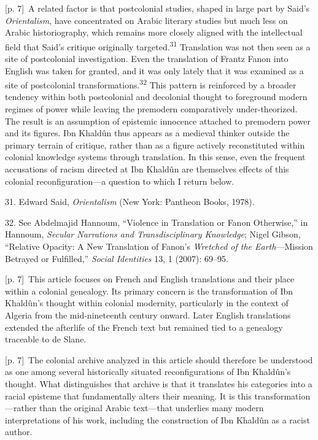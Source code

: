 \documentclass[10pt,a4paper]{article}
\begin{document}
{\scriptsize\color{gray} [p. 7]}\ A related factor is that postcolonial studies, shaped in large part by Said’s \textit{Orientalism}, have concentrated on Arabic literary studies but much less on Arabic historiography, which remains more closely aligned with the intellectual field that Said’s critique originally targeted.\nobreak\textsuperscript{31} Translation was not then seen as a site of postcolonial investigation. Even the translation of Frantz Fanon into English was taken for granted, and it was only lately that it was examined as a site of postcolonial transformations.\nobreak\textsuperscript{32} This pattern is reinforced by a broader tendency within both postcolonial and decolonial thought to foreground modern regimes of power while leaving the premodern comparatively under-theorized. The result is an assumption of epistemic innocence attached to premodern power and its figures. Ibn Khaldûn thus appears as a medieval thinker outside the primary terrain of critique, rather than as a figure actively reconstituted within colonial knowledge systems through translation. In this sense, even the frequent accusations of racism directed at Ibn Khaldûn are themselves effects of this colonial reconfiguration—a question to which I return below.\par{\small 31. Edward Said, \textit{Orientalism} (New York: Pantheon Books, 1978).\par}{\small 32. See Abdelmajid Hannoum, “Violence in Translation or Fanon Otherwise,” in Hannoum, \textit{Secular Narrations and Transdisciplinary Knowledge}; Nigel Gibson, “Relative Opacity: A New Translation of Fanon’s \textit{Wretched of the Earth}—Mission Betrayed or Fulfilled,” \textit{Social Identities} 13, 1 (2007): 69–95.\par}
{\scriptsize\color{gray} [p. 7]}\ This article focuses on French and English translations and their place within a colonial genealogy. Its primary concern is the transformation of Ibn Khaldûn’s thought within colonial modernity, particularly in the context of Algeria from the mid-nineteenth century onward. Later English translations extended the afterlife of the French text but remained tied to a genealogy traceable to de Slane.\par
{\scriptsize\color{gray} [p. 7]}\ The colonial archive analyzed in this article should therefore be understood as one among several historically situated reconfigurations of Ibn Khaldûn’s thought. What distinguishes that archive is that it translates his categories into a racial episteme that fundamentally alters their meaning. It is this transformation—rather than the original Arabic text—that underlies many modern interpretations of his work, including the construction of Ibn Khaldûn as a racist author.\par
\end{document}
